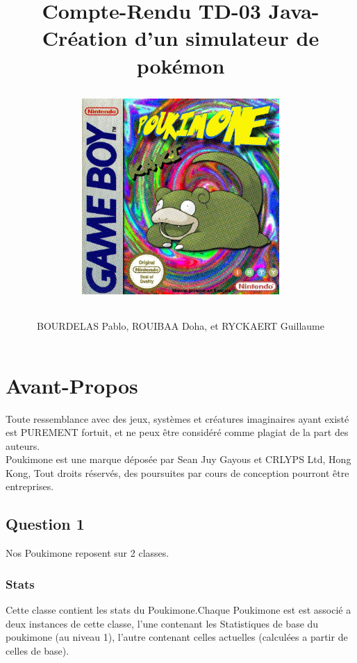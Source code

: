 \documentclass{report}
\begin{document}
\title{%
    \begin{minipage}\linewidth
        \centering
        Compte-Rendu TD-03 
        \vskip 3pt
        \large Java-Création d'un simulateur de pokémon
        \author{BOURDELAS Pablo, ROUIBAA Doha, et RYCKAERT Guillaume}
    \end{minipage}
\begin{figure}[ht!]
    \centering
    \includegraphics[width=75mm]{cover.jpg}
\end{figure}
    }   

\maketitle

\chapter*{Avant-Propos}
Toute ressemblance avec des jeux, systèmes et créatures imaginaires ayant existé est PUREMENT fortuit, et ne peux être considéré comme plagiat de la part des auteurs.\\
Poukimone est une marque déposée par Sean Juy Gayous et CRLYPS Ltd, Hong Kong, Tout droits réservés, des poursuites par cours de conception pourront être entreprises.
 
\newpage
\section*{Question 1}

Nos Poukimone reposent sur 2 classes.
\subsection*{Stats}
Cette classe contient les stats du Poukimone.Chaque Poukimone est est associé a deux instances de cette classe, l'une contenant les Statistiques de base du poukimone (au niveau 1), l'autre contenant celles actuelles (calculées a partir de celles de base).
\end{document}
